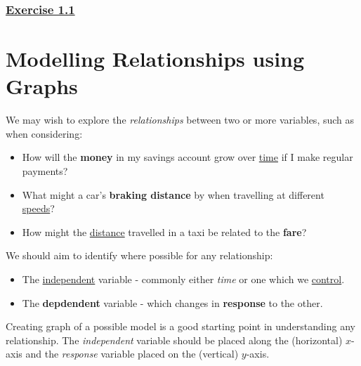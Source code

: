 \documentclass[
  11pt,
  openany]{book}
\begin{document}
\protect{}\label{ex11q}{}

\subsubsection*{\texorpdfstring{\hyperref[ex11a]{Exercise 1.1}}{Exercise 1.1}}\label{exercise-1.1}

\newpage

\section{Modelling Relationships using Graphs}\label{modelling-relationships-using-graphs}

We may wish to explore the \emph{relationships} between two or more variables, such as when considering:

\begin{center}
    \begin{tcolorbox}[title=Questions,center,colback=Aquamarine!5,colframe=Aquamarine,width=16cm]
        \begin{itemize}
            \item How will the \textbf{money} in my savings account grow over \underline{time} if I make regular payments?
            \item What might a car's \textbf{braking distance} by when travelling at different \underline{speeds}?
            \item How might the \underline{distance} travelled in a taxi be related to the \textbf{fare}?
        \end{itemize}
    \end{tcolorbox}
\end{center}

We should aim to identify where possible for any relationship:

\begin{itemize}[leftmargin=2.3cm]
    \item The \underline{independent} variable - commonly either \textit{time} or one which we \underline{control}.
    \item The \textbf{depdendent} variable - which changes in \textbf{response} to the other.
\end{itemize}

Creating graph of a possible model is a good starting point in understanding any relationship. The \emph{independent} variable should be placed along the (horizontal) \(x\)-axis and the \emph{response} variable placed on the (vertical) \(y\)-axis.
\end{document}
